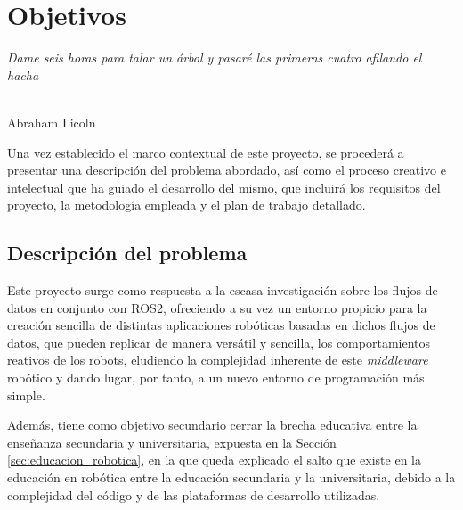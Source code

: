 \chapter{Objetivos}
\label{cap:capitulo2}

\begin{flushright}
\begin{minipage}[]{10cm}
\emph{Dame seis horas para talar un árbol y pasaré las primeras cuatro afilando el hacha}\\
\end{minipage}\\

Abraham Licoln\\
\end{flushright}

\vspace{1cm}

Una vez establecido el marco contextual de este proyecto, se procederá a
presentar una descripción del problema abordado, así como el proceso creativo e
intelectual que ha guiado el desarrollo del mismo, que incluirá los requisitos
del proyecto, la metodología empleada y el plan de trabajo detallado.


\section{Descripción del problema}
\label{sec:descripcion}

Este proyecto surge como respuesta a la escasa investigación sobre los flujos de
datos en conjunto con ROS2, ofreciendo a su vez un entorno propicio para la
creación sencilla de distintas aplicaciones robóticas basadas en dichos flujos
de datos, que pueden replicar de manera versátil y sencilla, los comportamientos
reativos de los robots, eludiendo la complejidad inherente de este
\textit{middleware} robótico y dando lugar, por tanto, a un nuevo entorno de
programación más simple.

Además, tiene como objetivo secundario cerrar la brecha educativa entre la
enseñanza secundaria y universitaria, expuesta en la Sección
\ref{sec:educacion_robotica}, en la que queda explicado el salto que existe en
la educación en robótica entre la educación secundaria y la universitaria,
debido a la complejidad del código y de las plataformas de desarrollo
utilizadas.

